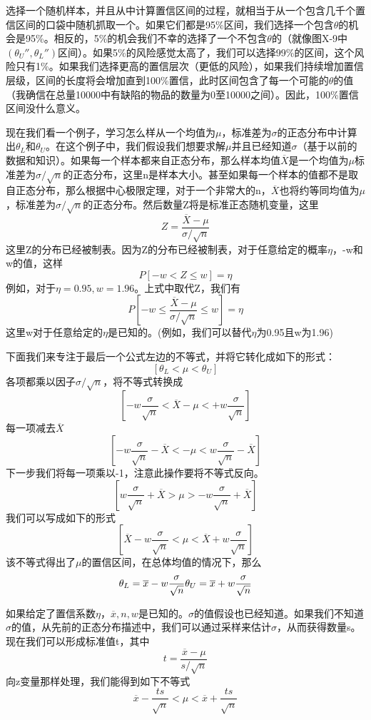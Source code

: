 \documentclass[cn,11pt,chinese]{elegantbook}
\begin{document}
{选择一个随机样本，并且从中计算置信区间的过程，就相当于从一个包含几千个置信区间的口袋中随机抓取一个。如果它们都是95\%区间，我们选择一个包含$\theta$的机会是95\%。相反的，5\%的机会我们不幸的选择了一个不包含$\theta$的（就像图X-9中$(\theta_U'',\theta_L'')$区间）。如果5\%的风险感觉太高了，我们可以选择99\%的区间，这个风险只有1\%。如果我们选择更高的置信层次（更低的风险），如果我们持续增加置信层级，区间的长度将会增加直到100\%置信，此时区间包含了每一个可能的$\theta$的值（我确信在总量10000中有缺陷的物品的数量为0至10000之间）。因此，100\%置信区间没什么意义。

现在我们看一个例子，学习怎么样从一个均值为$\mu$，标准差为$\sigma$的正态分布中计算出$\theta_L$和$\theta_U$。在这个例子中，我们假设我们想要求解$\mu$并且已经知道$\sigma$（基于以前的数据和知识）。如果每一个样本都来自正态分布，那么样本均值$\overline{X}$是一个均值为$\mu$标准差为$\sigma/\sqrt{n}$的正态分布，这里n是样本大小。甚至如果每一个样本的值都不是取自正态分布，那么根据中心极限定理，对于一个非常大的n，$\overline{X}$也将约等同均值为$\mu$，标准差为$\sigma/\sqrt{n}$的正态分布。然后数量Z将是标准正态随机变量，这里
$$Z=\frac{\overline{X}-\mu}{\sigma/\sqrt{n}}$$
这里Z的分布已经被制表。因为Z的分布已经被制表，对于任意给定的概率$\eta$，-w和w的值，这样
$$P[-w < Z \leq w] = \eta$$
例如，对于$\eta = 0.95, w= 1.96$。上式中取代Z，我们有
$$P[-w\leq\frac{\overline{X}-\mu}{\sigma/\sqrt{n}}\leq w]=\eta$$
这里w对于任意给定的$\eta$是已知的。(例如，我们可以替代$\eta$为0.95且w为1.96)

下面我们来专注于最后一个公式左边的不等式，并将它转化成如下的形式：
$$[\theta_L<\mu<\theta_U]$$
各项都乘以因子$\sigma/\sqrt{n}$，将不等式转换成
$$[-w\frac{\sigma}{\sqrt{n}}<\overline{X}-\mu<+w\frac{\sigma}{\sqrt{n}}]$$
每一项减去$\overline{X}$
$$[-w\frac{\sigma}{\sqrt{n}}-\overline{X}<-\mu<w\frac{\sigma}{\sqrt{n}}-\overline{X}]$$
下一步我们将每一项乘以-1，注意此操作要将不等式反向。
$$[w\frac{\sigma}{\sqrt{n}}+\overline{X}>\mu>-w\frac{\sigma}{\sqrt{n}}+\overline{X}]$$
我们可以写成如下的形式
$$[\overline{X}-w\frac{\sigma}{\sqrt{n}}<\mu<\overline{X}+w\frac{\sigma}{\sqrt{n}}]$$
该不等式得出了$\mu$的置信区间，在总体均值的情况下，那么
$$\theta_L=\overline{x}-w\frac{\sigma}{\sqrt{n}} \\
\theta_U=\overline{x}+w\frac{\sigma}{\sqrt{n}}$$

如果给定了置信系数$\eta$，$\overline{x},n,w$是已知的。$\sigma$的值假设也已经知道。如果我们不知道$\sigma$的值，从先前的正态分布描述中，我们可以通过采样来估计$\sigma$，从而获得数量s。现在我们可以形成标准值t，其中
$$t=\frac{\overline{x}-\mu}{s/\sqrt{n}}$$
向z变量那样处理，我们能得到如下不等式
$$\overline{x}-\frac{ts}{\sqrt{n}}<\mu<\overline{x}+\frac{ts}{\sqrt{n}}$$

}
\end{document}
